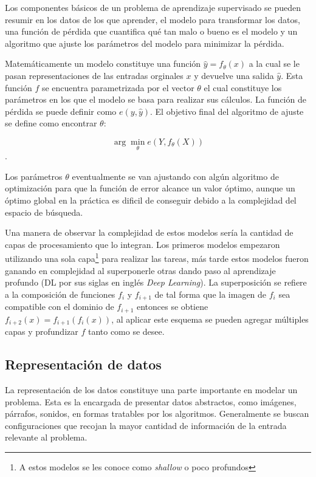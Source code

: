 Los componentes básicos de un problema de aprendizaje supervisado se pueden resumir en los datos de los que 
aprender, el modelo para transformar los datos, una función de pérdida que cuantifica qué tan malo o bueno es el 
modelo y un algoritmo que ajuste los parámetros del modelo para minimizar la pérdida.

Matemáticamente un modelo constituye una función $\hat{y} = f_{\theta}(x)$ a la cual se 
le pasan representaciones de las entradas orginales $x$ y devuelve una salida $\hat{y}$. Esta función $f$ se encuentra
parametrizada por el vector $\theta$ el cual constituye los parámetros en los que el modelo se basa para realizar sus
cálculos. La función de pérdida se puede definir como $e(y, \hat{y})$. El objetivo final del algoritmo de ajuste 
se define como encontrar $\theta$:

\begin{equation}
	\arg \min_{\theta} e(Y, f_{\theta}(X))
\end{equation}\label{eq:arg_min_theta}.

Los parámetros $\theta$ eventualmente se van ajustando con algún algoritmo de optimización para que 
la función de error alcance un valor óptimo, aunque un óptimo global en la práctica es dificil de conseguir
debido a la complejidad del espacio de búsqueda.

Una manera de observar la complejidad de estos modelos sería la cantidad de capas de procesamiento que lo integran.
Los primeros modelos empezaron utilizando una sola capa\footnote{A estos modelos se les conoce 
como \emph{shallow} o poco profundos} para realizar 
las tareas, más tarde estos modelos fueron ganando en complejidad al superponerle otras dando paso al 
aprendizaje profundo (DL por sus siglas en inglés \emph{Deep Learning}). La superposición se refiere
a la composición de funciones $f_i$ y $f_{i+1}$ de tal forma que la imagen de $f_i$ sea compatible con el dominio de 
$f_{i+1}$ entonces se obtiene $f_{i+2}(x) = f_{i+1}(f_i(x))$, al aplicar este esquema se pueden agregar múltiples
capas y profundizar $f$ tanto como se desee.


\subsection{Representación de datos}

La representación de los datos constituye una parte importante en modelar un problema. Esta 
es la encargada de presentar datos abstractos, como imágenes, párrafos, sonidos, en formas tratables
por los algoritmos. Generalmente se buscan configuraciones que recojan la mayor cantidad de información 
de la entrada relevante al problema.

